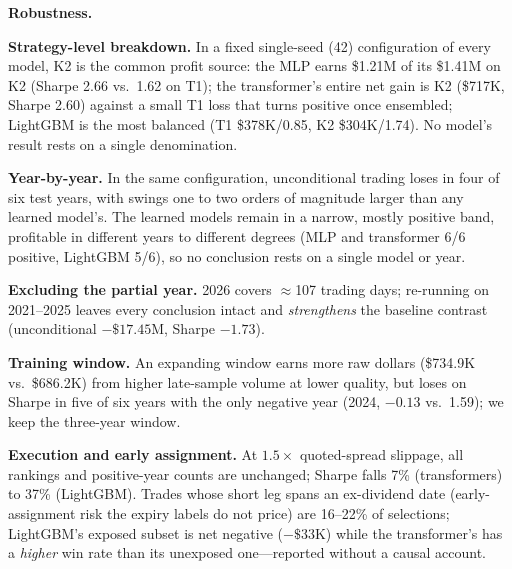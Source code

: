 \documentclass[sigconf,review]{acmart}
\begin{document}
\medskip\noindent\textbf{Robustness.}
\label{sec:robustness}

\noindent\textbf{Strategy-level breakdown.} In a fixed single-seed (42) configuration of every model, K2 is the common profit source: the MLP earns \$1.21M of its \$1.41M on K2 (Sharpe 2.66 vs.\ 1.62 on T1); the transformer's entire net gain is K2 (\$717K, Sharpe 2.60) against a small T1 loss that turns positive once ensembled; LightGBM is the most balanced (T1 \$378K/0.85, K2 \$304K/1.74). No model's result rests on a single denomination.

\noindent\textbf{Year-by-year.} In the same configuration, unconditional trading loses in four of six test years, with swings one to two orders of magnitude larger than any learned model's. The learned models remain in a narrow, mostly positive band, profitable in different years to different degrees (MLP and transformer 6/6 positive, LightGBM 5/6), so no conclusion rests on a single model or year.

\noindent\textbf{Excluding the partial year.} 2026 covers $\approx$107 trading days; re-running on 2021--2025 leaves every conclusion intact and \emph{strengthens} the baseline contrast (unconditional $-\$17.45$M, Sharpe $-1.73$).

\noindent\textbf{Training window.} An expanding window earns more raw dollars (\$734.9K vs.\ \$686.2K) from higher late-sample volume at lower quality, but loses on Sharpe in five of six years with the only negative year (2024, $-0.13$ vs.\ 1.59); we keep the three-year window.

\noindent\textbf{Execution and early assignment.} At $1.5\times$ quoted-spread slippage, all rankings and positive-year counts are unchanged; Sharpe falls 7\% (transformers) to 37\% (LightGBM). Trades whose short leg spans an ex-dividend date (early-assignment risk the expiry labels do not price) are 16--22\% of selections; LightGBM's exposed subset is net negative ($-\$33$K) while the transformer's has a \emph{higher} win rate than its unexposed one---reported without a causal account.
\end{document}

